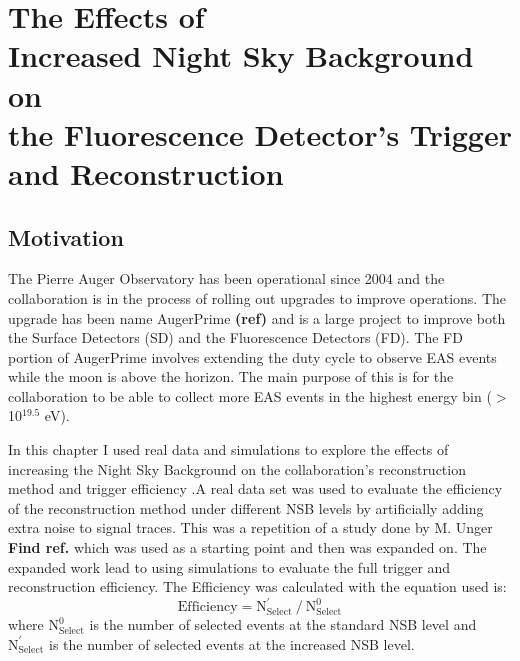 \chapter[The Effects of Increased NSB on the FD Trigger and Reconstruction]{\centering The Effects of \\ Increased Night Sky Background on \\ the Fluorescence Detector's Trigger and Reconstruction \\ }\label{Ch:SelectEff}




\section{Motivation}

The Pierre Auger Observatory has been operational since 2004 and the collaboration  is in the process of rolling out upgrades to improve operations. The upgrade has been name AugerPrime \textbf{(ref)} and is a large project to improve both the Surface Detectors (SD) and the Fluorescence Detectors (FD). The FD portion of AugerPrime involves extending the duty cycle to observe EAS events while the moon is above the horizon. The main purpose of this is for the collaboration to be able to collect more EAS events in the highest energy bin ($>$ 10$^{19.5}$ eV). 

In this chapter I used real data and simulations to explore the effects of increasing the Night Sky Background on the collaboration's reconstruction method and trigger efficiency .A real data set was used to evaluate the efficiency of the reconstruction method under different NSB levels by artificially adding extra noise to signal traces. This was a repetition of a study done by M. Unger \textbf{Find ref.} which was used as a starting point and then was expanded on. The expanded work lead to using simulations to evaluate the full trigger and reconstruction efficiency. The Efficiency was calculated with the equation used is:
\begin{equation}
\mathrm{Efficiency} = \mathrm{N}^{'}_{\mathrm{Select}} \ / \ \mathrm{N}^0_{\mathrm{Select}}
\end{equation}
where $\mathrm{N}^{0}_{\mathrm{Select}}$ is the number of selected events at the standard NSB level and $\mathrm{N}^{'}_{\mathrm{Select}}$ is the number of selected events at the increased NSB
level. 

